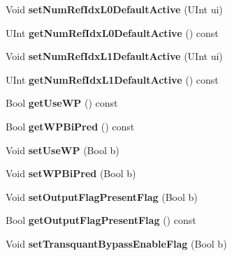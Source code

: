 \begin{DoxyCompactItemize}
\item 
\mbox{\label{class_t_com_p_p_s_a7f9c1af410c870d710cdf8b671010529}} 
Void {\bfseries set\+Num\+Ref\+Idx\+L0\+Default\+Active} (U\+Int ui)
\item 
\mbox{\label{class_t_com_p_p_s_af58717947675db3ff5c2c03cabecb7f5}} 
U\+Int {\bfseries get\+Num\+Ref\+Idx\+L0\+Default\+Active} () const
\item 
\mbox{\label{class_t_com_p_p_s_a50dad07337ee3fc3745352f5b2b3a693}} 
Void {\bfseries set\+Num\+Ref\+Idx\+L1\+Default\+Active} (U\+Int ui)
\item 
\mbox{\label{class_t_com_p_p_s_a451a1bbc039d99af0ceb47e296eecf78}} 
U\+Int {\bfseries get\+Num\+Ref\+Idx\+L1\+Default\+Active} () const
\item 
\mbox{\label{class_t_com_p_p_s_aa2fbd2eaadd8664707dbf45380d73df7}} 
Bool {\bfseries get\+Use\+WP} () const
\item 
\mbox{\label{class_t_com_p_p_s_a3499e3586f8945a2e4b780e59adf0ec3}} 
Bool {\bfseries get\+W\+P\+Bi\+Pred} () const
\item 
\mbox{\label{class_t_com_p_p_s_a3821cb66cd6f6dcf68de3c117195b20e}} 
Void {\bfseries set\+Use\+WP} (Bool b)
\item 
\mbox{\label{class_t_com_p_p_s_a4266b73c8bcde43f76a42d91fad581c6}} 
Void {\bfseries set\+W\+P\+Bi\+Pred} (Bool b)
\item 
\mbox{\label{class_t_com_p_p_s_a84a04b6a1dfef01c8db8fd1a6016d887}} 
Void {\bfseries set\+Output\+Flag\+Present\+Flag} (Bool b)
\item 
\mbox{\label{class_t_com_p_p_s_a9e9176d1accc6a53678486a9d326555f}} 
Bool {\bfseries get\+Output\+Flag\+Present\+Flag} () const
\item 
\mbox{\label{class_t_com_p_p_s_a2fb4087dbea230036aca464c1f32abd7}} 
Void {\bfseries set\+Transquant\+Bypass\+Enable\+Flag} (Bool b)

\end{DoxyCompactItemize}
